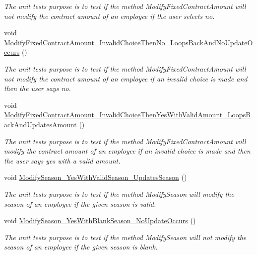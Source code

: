 \begin{DoxyCompactItemize}
\begin{DoxyCompactList}\small\item\em The unit test\textquotesingle{}s purpose is to test if the method Modify\+Fixed\+Contract\+Amount will not modify the contract amount of an employee if the user selects no. \end{DoxyCompactList}\item 
void \hyperlink{class_the_company_1_1_tests_1_1_modify_employee_tests_ae8d993a3a3c72fdd647c22e7dc27cd77}{Modify\+Fixed\+Contract\+Amount\+\_\+\+Invalid\+Choice\+Then\+No\+\_\+\+Loops\+Back\+And\+No\+Update\+Occurs} ()
\begin{DoxyCompactList}\small\item\em The unit test\textquotesingle{}s purpose is to test if the method Modify\+Fixed\+Contract\+Amount will not modify the contract amount of an employee if an invalid choice is made and then the user says no. \end{DoxyCompactList}\item 
void \hyperlink{class_the_company_1_1_tests_1_1_modify_employee_tests_ab3f95a80f50c9b4276f7de28660ba6da}{Modify\+Fixed\+Contract\+Amount\+\_\+\+Invalid\+Choice\+Then\+Yes\+With\+Valid\+Amount\+\_\+\+Loops\+Back\+And\+Updates\+Amount} ()
\begin{DoxyCompactList}\small\item\em The unit test\textquotesingle{}s purpose is to test if the method Modify\+Fixed\+Contract\+Amount will modify the contract amount of an employee if an invalid choice is made and then the user says yes with a valid amount. \end{DoxyCompactList}\item 
void \hyperlink{class_the_company_1_1_tests_1_1_modify_employee_tests_ae3ccbdede7ef3c16bd982267b71641fb}{Modify\+Season\+\_\+\+Yes\+With\+Valid\+Season\+\_\+\+Updates\+Season} ()
\begin{DoxyCompactList}\small\item\em The unit test\textquotesingle{}s purpose is to test if the method Modify\+Season will modify the season of an employee if the given season is valid. \end{DoxyCompactList}\item 
void \hyperlink{class_the_company_1_1_tests_1_1_modify_employee_tests_a17f9ef2f3c959cb134810b1cb62678d0}{Modify\+Season\+\_\+\+Yes\+With\+Blank\+Season\+\_\+\+No\+Update\+Occurs} ()
\begin{DoxyCompactList}\small\item\em The unit test\textquotesingle{}s purpose is to test if the method Modify\+Season will not modify the season of an employee if the given season is blank. \end{DoxyCompactList}\item 

\end{DoxyCompactItemize}
